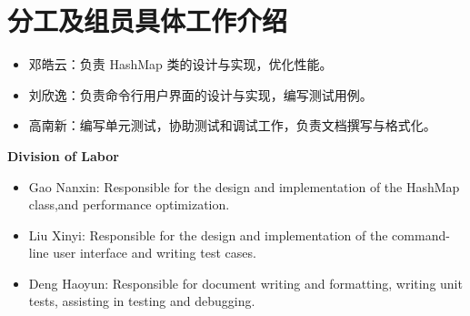\documentclass{article}
\begin{document}
\section{分工及组员具体工作介绍}
    \begin{itemize}
        \item 邓皓云：负责 HashMap 类的设计与实现，优化性能。
        \item 刘欣逸：负责命令行用户界面的设计与实现，编写测试用例。
        \item 高南新：编写单元测试，协助测试和调试工作，负责文档撰写与格式化。
    \end{itemize}

    \bigskip
    \textbf{Division of Labor}\\
    \begin{itemize}
        \item Gao Nanxin: Responsible for the design and implementation of the HashMap class,and performance optimization.
        \item Liu Xinyi: Responsible for the design and implementation of the command-line user interface and writing test cases.
        \item Deng Haoyun: Responsible for document writing and formatting,  writing unit tests, assisting in testing and debugging.
    \end{itemize}
\end{document}
